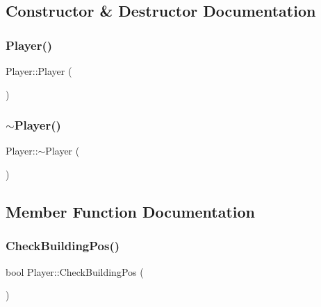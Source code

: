 \subsection{Constructor \& Destructor Documentation}
\mbox{\label{class_player_affe0cc3cb714f6deb4e62f0c0d3f1fd8}} 
\subsubsection{\texorpdfstring{Player()}{Player()}}
{\footnotesize\ttfamily Player\+::\+Player (\begin{DoxyParamCaption}{ }\end{DoxyParamCaption})}

\mbox{\label{class_player_a749d2c00e1fe0f5c2746f7505a58c062}} 
\subsubsection{\texorpdfstring{$\sim$Player()}{~Player()}}
{\footnotesize\ttfamily Player\+::$\sim$\+Player (\begin{DoxyParamCaption}{ }\end{DoxyParamCaption})}



\subsection{Member Function Documentation}
\mbox{\label{class_player_a6879cbd220edf52a79c1c217d2f158e9}} 
\subsubsection{\texorpdfstring{CheckBuildingPos()}{CheckBuildingPos()}}
{\footnotesize\ttfamily bool Player\+::\+Check\+Building\+Pos (\begin{DoxyParamCaption}{ }\end{DoxyParamCaption})}

\mbox{\label{class_player_a84ce05afd52adb5138c021b100164a66}} 
